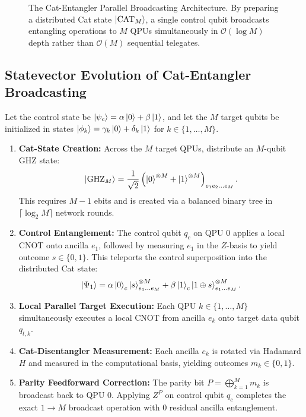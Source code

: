\begin{figure}[htbp]
    \caption{The Cat-Entangler Parallel Broadcasting Architecture. By preparing a distributed Cat state $\ket{\text{CAT}_M}$, a single control qubit broadcasts entangling operations to $M$ QPUs simultaneously in $\mathcal{O}(\log M)$ depth rather than $\mathcal{O}(M)$ sequential telegates.}
    \label{fig:cat_entangler_tree}
\end{figure}

\subsection{Statevector Evolution of Cat-Entangler Broadcasting}
Let the control state be $\ket{\psi_c} = \alpha\ket{0} + \beta\ket{1}$, and let the $M$ target qubits be initialized in states $\ket{\phi_k} = \gamma_k \ket{0} + \delta_k \ket{1}$ for $k \in \{1, \dots, M\}$.

\begin{enumerate}
    \item \textbf{Cat-State Creation:} Across the $M$ target QPUs, distribute an $M$-qubit GHZ state:
    \begin{equation}
        \ket{\text{GHZ}_M} = \frac{1}{\sqrt{2}} \left( \ket{0}^{\otimes M} + \ket{1}^{\otimes M} \right)_{e_1 e_2 \dots e_M}.
    \end{equation}
    This requires $M-1$ ebits and is created via a balanced binary tree in $\lceil \log_2 M \rceil$ network rounds.
    
    \item \textbf{Control Entanglement:} The control qubit $q_c$ on QPU 0 applies a local CNOT onto ancilla $e_1$, followed by measuring $e_1$ in the $Z$-basis to yield outcome $s \in \{0, 1\}$. This teleports the control superposition into the distributed Cat state:
    \begin{equation}
        \ket{\Psi_1} = \alpha \ket{0}_c \ket{s}^{\otimes M}_{e_1 \dots e_M} + \beta \ket{1}_c \ket{1 \oplus s}^{\otimes M}_{e_1 \dots e_M}.
    \end{equation}
    
    \item \textbf{Local Parallel Target Execution:} Each QPU $k \in \{1, \dots, M\}$ simultaneously executes a local CNOT from ancilla $e_k$ onto target data qubit $q_{t, k}$.
    
    \item \textbf{Cat-Disentangler Measurement:} Each ancilla $e_k$ is rotated via Hadamard $H$ and measured in the computational basis, yielding outcomes $m_k \in \{0, 1\}$.
    
    \item \textbf{Parity Feedforward Correction:} The parity bit $P = \bigoplus_{k=1}^M m_k$ is broadcast back to QPU 0. Applying $Z^P$ on control qubit $q_c$ completes the exact $1 \to M$ broadcast operation with 0 residual ancilla entanglement.
\end{enumerate}

